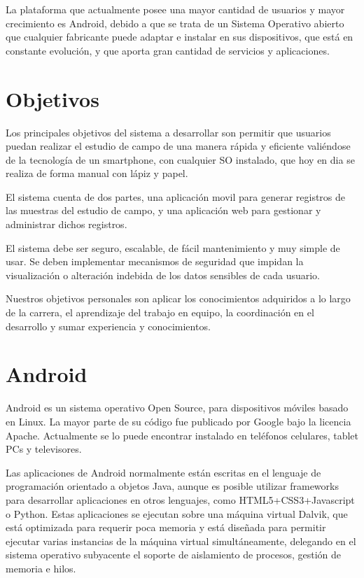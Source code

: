 La plataforma que actualmente posee una mayor cantidad de usuarios y mayor crecimiento es Android, debido a que se trata de un Sistema Operativo abierto que cualquier fabricante puede adaptar e instalar en sus dispositivos, que está en constante evolución, y que aporta gran cantidad de servicios y aplicaciones. 

\section{Objetivos}

Los principales objetivos del sistema a desarrollar son permitir que usuarios puedan realizar el estudio de campo de una manera rápida y eficiente valiéndose de la tecnología de un smartphone, con cualquier SO instalado, que hoy en dia se realiza de forma manual con lápiz y papel.

El sistema cuenta de dos partes, una aplicación movil para generar registros de las muestras del estudio de campo, y una aplicación web para gestionar y administrar dichos registros.

El sistema debe ser seguro, escalable, de fácil mantenimiento y muy simple de usar. Se deben implementar mecanismos de seguridad que impidan la visualización o alteración indebida de los datos sensibles de cada usuario.

Nuestros objetivos personales son aplicar los conocimientos adquiridos a lo largo de la carrera, el aprendizaje del trabajo en equipo, la coordinación en el desarrollo y sumar experiencia y conocimientos.


\section{Android}
Android es un sistema operativo Open Source, para dispositivos móviles basado en Linux. La mayor parte de su código fue publicado por Google bajo la licencia Apache. Actualmente se lo puede encontrar instalado en teléfonos celulares, tablet PCs y televisores.


Las aplicaciones de Android normalmente están escritas en el lenguaje de programación orientado a objetos Java, aunque es posible utilizar frameworks para desarrollar aplicaciones en otros lenguajes, como HTML5+CSS3+Javascript o Python. Estas aplicaciones se ejecutan sobre una máquina virtual Dalvik, que está optimizada para requerir poca memoria y está diseñada para permitir ejecutar varias instancias de la máquina virtual simultáneamente, delegando en el sistema operativo subyacente el soporte de aislamiento de procesos, gestión de memoria e hilos.

